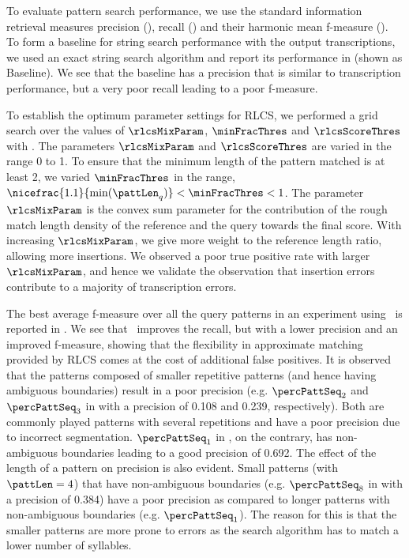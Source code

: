To evaluate pattern search performance, we use the standard information retrieval measures precision (\precision), recall (\recall) and their harmonic mean f-measure (\fmeas). To form a baseline for string search performance with the output transcriptions, we used an exact string search algorithm and report its performance in  (shown as Baseline). We see that the baseline has a precision that is similar to transcription performance, but a very poor recall leading to a poor f-measure. %

To establish the optimum parameter settings for \gls{RLCS}, we performed a grid search over the values of $\rlcsMixParam$, $\minFracThres$ and $\rlcsScoreThres$ with \rlcso. The parameters $\rlcsMixParam$ and $\rlcsScoreThres$ are varied in the range 0 to 1. To ensure that the minimum length of the pattern matched is at least 2, we varied $\minFracThres$ in the range, $\nicefrac{1.1}{\min(\pattLen_q)} < \minFracThres < 1$. The parameter $\rlcsMixParam$ is the convex sum parameter for the contribution of the rough match length density of the reference and the query towards the final score. With increasing $\rlcsMixParam$, we give more weight to the reference length ratio, allowing more insertions. We observed a poor true positive rate with larger $\rlcsMixParam$, and hence we validate the observation that insertion errors contribute to a majority of transcription errors. 

The best average f-measure over all the query patterns in an experiment using \rlcso\ is reported in . We see that \rlcso\ improves the recall, but with a lower precision and an improved f-measure, showing that the flexibility in approximate matching provided by \gls{RLCS} comes at the cost of additional false positives. It is observed that the patterns composed of smaller repetitive patterns (and hence having ambiguous boundaries) result in a poor precision (e.g. $\percPattSeq_2$ and $\percPattSeq_3$ in  with a precision of 0.108 and 0.239, respectively). Both are commonly played patterns with several repetitions and have a poor precision due to incorrect segmentation. $\percPattSeq_1$ in , on the contrary, has non-ambiguous boundaries leading to a good precision of 0.692. The effect of the length of a pattern on precision is also evident. Small patterns (with $\pattLen=4$) that have non-ambiguous boundaries (e.g. $\percPattSeq_8$ in  with a precision of 0.384) have a poor precision as compared to longer patterns with non-ambiguous boundaries (e.g. $\percPattSeq_1$). The reason for this is that the smaller patterns are more prone to errors as the search algorithm has to match a lower number of syllables. 

